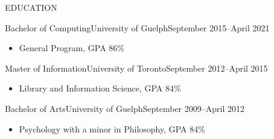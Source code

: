 \documentclass[]{mcdowellcv}
\begin{document}
	\makeheader
	
	\begin{cvsection}{EDUCATION}
		\begin{cvsubsection}{Bachelor of Computing}{University of Guelph}{September 2015--April 2021}
			\begin{itemize}
				\item General Program, GPA 86\%
			\end{itemize}
		\end{cvsubsection}

		\begin{cvsubsection}{Master of Information}{University of Toronto}{September 2012--April 2015}
			\begin{itemize}
				\item Library and Information Science, GPA 84\%
			\end{itemize}
		\end{cvsubsection}

		\begin{cvsubsection}{Bachelor of Arts}{University of Guelph}{September 2009--April 2012}
			\begin{itemize}
				\item Psychology with a minor in Philosophy, GPA 84\%
			\end{itemize}
		\end{cvsubsection}
	\end{cvsection}
\end{document}
